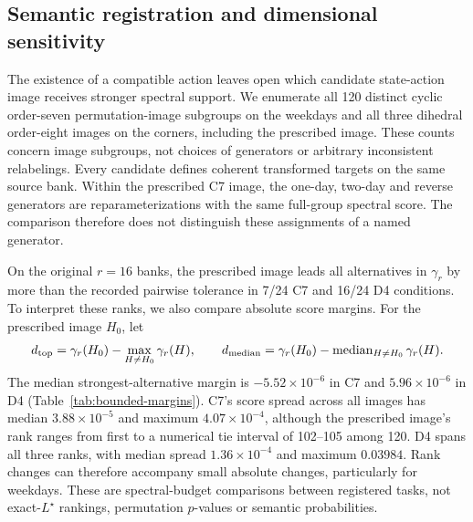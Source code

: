 \subsection{Semantic registration and dimensional sensitivity}
\label{sec:registration-sensitivity}
The existence of a compatible action leaves open which candidate state-action image receives stronger spectral support. We enumerate all 120 distinct cyclic order-seven permutation-image subgroups on the weekdays and all three dihedral order-eight images on the corners, including the prescribed image. These counts concern image subgroups, not choices of generators or arbitrary inconsistent relabelings. Every candidate defines coherent transformed targets on the same source bank. Within the prescribed C7 image, the one-day, two-day and reverse generators are reparameterizations with the same full-group spectral score. The comparison therefore does not distinguish these assignments of a named generator.

On the original $r=16$ banks, the prescribed image leads all alternatives in $\gamma_r$ by more than the recorded pairwise tolerance in 7/24 C7 and 16/24 D4 conditions. To interpret these ranks, we also compare absolute score margins. For the prescribed image $H_0$, let
\[
 d_{\rm top}=\gamma_r(H_0)-\max_{H\ne H_0}\gamma_r(H),\qquad
 d_{\rm median}=\gamma_r(H_0)-\operatorname{median}_{H\ne H_0}\gamma_r(H).
\]
The median strongest-alternative margin is $-5.52\times10^{-6}$ in C7 and $5.96\times10^{-6}$ in D4 (Table~\ref{tab:bounded-margins}). C7's score spread across all images has median $3.88\times10^{-5}$ and maximum $4.07\times10^{-4}$, although the prescribed image's rank ranges from first to a numerical tie interval of 102--105 among 120. D4 spans all three ranks, with median spread $1.36\times10^{-4}$ and maximum $0.03984$. Rank changes can therefore accompany small absolute changes, particularly for weekdays. These are spectral-budget comparisons between registered tasks, not exact-$L^\star$ rankings, permutation $p$-values or semantic probabilities.

\begin{table}[t]
\caption{Registration margins in the normalized score $\gamma_r$ at $r=16$ in all 24 fixed conditions per domain. Positive margins indicate a larger score for the prescribed image than for the strongest or median alternative. U/T/B counts unique leading, tied leading and behind under the recorded pairwise tolerance. The margins compare coherent target actions.}
\label{tab:bounded-margins}
\centering\small

\end{table}

